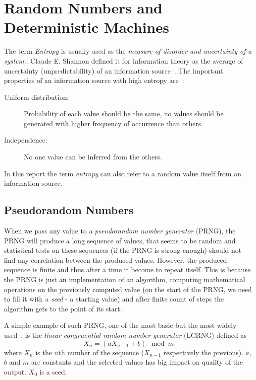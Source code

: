 \chapter{Random Numbers and Deterministic Machines}\label{chap:randomNumbers}

The term {\em Entropy} is usually used  as the {\em measure of disorder and uncertainty of a system}.\cite{Entrophy}. Claude E. Shannon defined it for information theory as the average of uncertainty (unpredictability) of an information source~\cite[p.~396]{AMathematicalTheoryOfCommunication}. The important properties of an information source with high entropy are~\cite[p.~150]{CryptographyAndNetworkSecurity}: 
\begin{description}
 \item [Uniform distribution:] Probability of each value should be the same, no values should be generated with higher frequency of occurrence than others.
 \item [Independence:] No one value can be inferred from the others.
\end{description}


In this report the term {\em entropy} can also refer to a random value itself from an information source. 



\section{Pseudorandom Numbers}
When we pass any value to a {\em pseudorandom number generator} (PRNG), the PRNG will produce a long sequence of values, that seems to be random and statistical tests on these sequences (if the PRNG is strong enough) should not find any correlation between the produced values. However, the produced sequence is finite and thus after a time it become to repeat itself. This is because the PRNG is just an implementation of an algorithm, computing mathematical operations on the previously computed value (on the start of the PRNG, we need to fill it with a {\em seed} - a starting value) and after finite count of steps the algorithm gets to the point of its start.

A simple example of such PRNG, one of the most basic but the most widely used~\cite[p.~151]{CryptographyAndNetworkSecurity}, is the {\em linear congruential random number generator} (LCRNG) defined as 
\begin{equation}\label{eq:LCRNG}
  X_n = (aX_{n-1} + b) \mod{m}
\end{equation}
where $X_n$ is the $n$th number of the sequence ($X_{n-1}$ respectively the previous). $a$, $b$ and $m$ are constants and the selected values has big impact on quality of the output. $X_0$ is a seed. 

